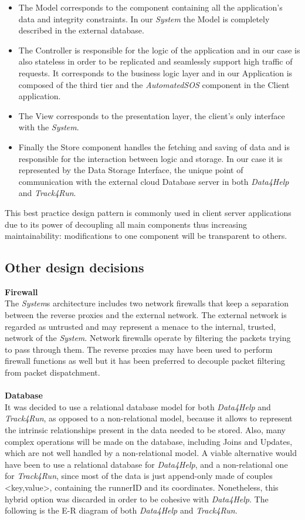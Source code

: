 \documentclass[titlepage]{article}
\begin{document}
\begin{itemize}
        \item {} The Model corresponds to the component containing all the application’s data and integrity constraints. In our {\it System} the Model is completely described in the external database.
		\item {} The Controller is responsible for the logic of the application and in our case is also stateless in order to be replicated and seamlessly support high traffic of requests. It corresponds to the business logic layer and in our Application is composed of the third tier and the {\it AutomatedSOS} component in the Client application. 
		\item {} The View corresponds to the presentation layer, the client’s only interface with the {\it System}. 
		\item {} Finally the Store component handles the fetching and saving of data and is responsible for the interaction between logic and storage. In our case it is represented by the Data Storage Interface, the unique point of communication with the external cloud Database server in both {\it Data4Help} and {\it Track4Run}.
    \end{itemize} 
This best practice design pattern is commonly used in client server applications due to its power of decoupling all main components thus increasing maintainability: modifications to one component will be transparent to others.
\pagebreak


\subsection{Other design decisions}

{\bf Firewall}\\
The {\it System}s architecture includes two network firewalls that keep a separation between the reverse proxies and the external network. The external network is regarded as untrusted and may represent a menace to the internal, trusted, network of the {\it System}.
Network firewalls operate by filtering the packets trying to pass through them.
The reverse proxies may have been used to perform firewall functions as well but it has been preferred to decouple packet filtering from packet dispatchment.\\ \\
{\bf Database}\\
It was decided to use a relational database model for both {\it Data4Help} and {\it Track4Run}, as opposed to a non-relational model, because it allows to represent the intrinsic relationships present in the data needed to be stored. Also, many complex operations will be made on the database, including Joins and Updates, which are not well handled by a non-relational model. 
A viable alternative would have been to use a relational database for {\it Data4Help}, and a non-relational one for {\it Track4Run}, since most of the data is just append-only made of couples <key,value>, containing the runnerID and its coordinates. Nonetheless, this hybrid option was discarded in order to be cohesive with {\it Data4Help}.
The following is the E-R diagram of both {\it Data4Help} and {\it Track4Run}.
\end{document}
